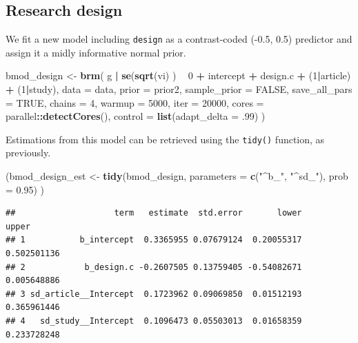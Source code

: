 \documentclass[floatsintext,doc]{apa6}
\newenvironment{Shaded}{\begin{snugshade}}{\end{snugshade}}
\newcommand{\DataTypeTok}[1]{\textcolor[rgb]{0.13,0.29,0.53}{#1}}
\newcommand{\DecValTok}[1]{\textcolor[rgb]{0.00,0.00,0.81}{#1}}
\newcommand{\FloatTok}[1]{\textcolor[rgb]{0.00,0.00,0.81}{#1}}
\newcommand{\KeywordTok}[1]{\textcolor[rgb]{0.13,0.29,0.53}{\textbf{#1}}}
\newcommand{\NormalTok}[1]{#1}
\newcommand{\OperatorTok}[1]{\textcolor[rgb]{0.81,0.36,0.00}{\textbf{#1}}}
\newcommand{\OtherTok}[1]{\textcolor[rgb]{0.56,0.35,0.01}{#1}}
\newcommand{\StringTok}[1]{\textcolor[rgb]{0.31,0.60,0.02}{#1}}
\begin{document}
\hypertarget{research-design}{%
\subsection{Research design}\label{research-design}}

We fit a new model including \texttt{design} as a contrast-coded (-0.5, 0.5) predictor and assign it a midly informative normal prior.

\begin{Shaded}
\begin{Highlighting}[]
\NormalTok{bmod_design <-}\StringTok{ }\KeywordTok{brm}\NormalTok{(}
\NormalTok{    g }\OperatorTok{|}\StringTok{ }\KeywordTok{se}\NormalTok{(}\KeywordTok{sqrt}\NormalTok{(vi) ) }\OperatorTok{~}\StringTok{ }\DecValTok{0} \OperatorTok{+}\StringTok{ }\NormalTok{intercept }\OperatorTok{+}\StringTok{ }\NormalTok{design.c }\OperatorTok{+}\StringTok{ }\NormalTok{(}\DecValTok{1}\OperatorTok{|}\NormalTok{article) }\OperatorTok{+}\StringTok{ }\NormalTok{(}\DecValTok{1}\OperatorTok{|}\NormalTok{study),}
    \DataTypeTok{data =}\NormalTok{ data,}
    \DataTypeTok{prior =}\NormalTok{ prior2,}
    \DataTypeTok{sample_prior =} \OtherTok{FALSE}\NormalTok{,}
    \DataTypeTok{save_all_pars =} \OtherTok{TRUE}\NormalTok{,}
    \DataTypeTok{chains =} \DecValTok{4}\NormalTok{,}
    \DataTypeTok{warmup =} \DecValTok{5000}\NormalTok{,}
    \DataTypeTok{iter =} \DecValTok{20000}\NormalTok{,}
    \DataTypeTok{cores =}\NormalTok{ parallel}\OperatorTok{::}\KeywordTok{detectCores}\NormalTok{(),}
    \DataTypeTok{control =} \KeywordTok{list}\NormalTok{(}\DataTypeTok{adapt_delta =} \FloatTok{.99}\NormalTok{)}
\NormalTok{    )}
\end{Highlighting}
\end{Shaded}

Estimations from this model can be retrieved using the \texttt{tidy()} function, as previously.

\begin{Shaded}
\begin{Highlighting}[]
\NormalTok{(bmod_design_est <-}\StringTok{ }\KeywordTok{tidy}\NormalTok{(bmod_design, }\DataTypeTok{parameters =} \KeywordTok{c}\NormalTok{(}\StringTok{"^b_"}\NormalTok{, }\StringTok{"^sd_"}\NormalTok{), }\DataTypeTok{prob =} \FloatTok{0.95}\NormalTok{) )}
\end{Highlighting}
\end{Shaded}

\begin{verbatim}
##                    term   estimate  std.error       lower       upper
## 1           b_intercept  0.3365955 0.07679124  0.20055317 0.502501136
## 2            b_design.c -0.2607505 0.13759405 -0.54082671 0.005648886
## 3 sd_article__Intercept  0.1723962 0.09069850  0.01512193 0.365961446
## 4   sd_study__Intercept  0.1096473 0.05503013  0.01658359 0.233728248
\end{verbatim}
\end{document}
